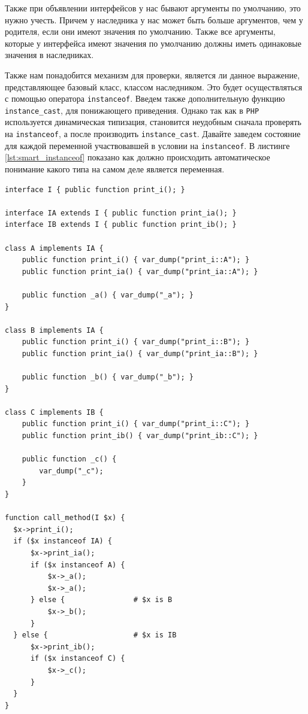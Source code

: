 Также при объявлении интерфейсов у нас бывают аргументы по умолчанию, это нужно учесть.
Причем у наследника у нас может быть больше аргументов, чем у родителя, если они имеют значения по умолчанию.
Также все аргументы, которые у интерфейса имеют значения по умолчанию должны иметь одинаковые значения в наследниках.

Также нам понадобится механизм для проверки, является ли данное выражение, представляющее базовый класс, классом наследником.
Это будет осуществляться с помощью оператора \verb|instanceof|.
Введем также дополнительную функцию \verb|instance_cast|, для понижающего приведения.
Однако так как в \verb|PHP| используется динамическая типизация, становится неудобным сначала проверять на \verb|instanceof|, а после производить \verb|instance_cast|.
Давайте заведем состояние для каждой переменной участвовавшей в условии на \verb|instanceof|.
В листинге \ref{lst:smart_instanceof} показано как должно происходить автоматическое понимание какого типа на самом деле является переменная.
\begin{lstlisting}[caption={Пример использования умного оператора instanceof},label={lst:smart_instanceof}]
interface I { public function print_i(); }

interface IA extends I { public function print_ia(); }
interface IB extends I { public function print_ib(); }

class A implements IA {
    public function print_i() { var_dump("print_i::A"); }
    public function print_ia() { var_dump("print_ia::A"); }

    public function _a() { var_dump("_a"); }
}

class B implements IA {
    public function print_i() { var_dump("print_i::B"); }
    public function print_ia() { var_dump("print_ia::B"); }

    public function _b() { var_dump("_b"); }
}

class C implements IB {
    public function print_i() { var_dump("print_i::C"); }
    public function print_ib() { var_dump("print_ib::C"); }

    public function _c() {
        var_dump("_c");
    }
}

function call_method(I $x) {
  $x->print_i();
  if ($x instanceof IA) {
      $x->print_ia();
      if ($x instanceof A) {
          $x->_a();
          $x->_a();
      } else {                # $x is B
          $x->_b();
      }
  } else {                    # $x is IB
      $x->print_ib();
      if ($x instanceof C) {
          $x->_c();
      }
  }
}
\end{lstlisting}

